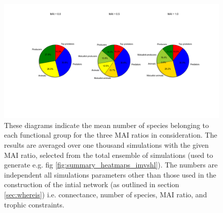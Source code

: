 \begin{itemize}
\begin{figure}
	\hspace{-2.5cm}
	\includegraphics[width=1.3\linewidth]{"./chapters/chapter04/figures/init_proportions"}
	\caption{These diagrams indicate the mean number of species belonging to each functional group for the three MAI ratios in consideration. The results are averaged over one thousand simulations with the given MAI ratio, selected from the total ensemble of simulations (used to generate e.g. fig \ref{fig:summary_heatmaps_imvshl}). The numbers are independent all simulations parameters other than those used in the construction of the intial network (as outlined in section \ref{sec:whereis}) i.e. connectance, number of species, MAI ratio, and trophic constraints. }
	\label{fig:initial_proportions}
\end{figure}


\clearpage
{}


\end{itemize}
